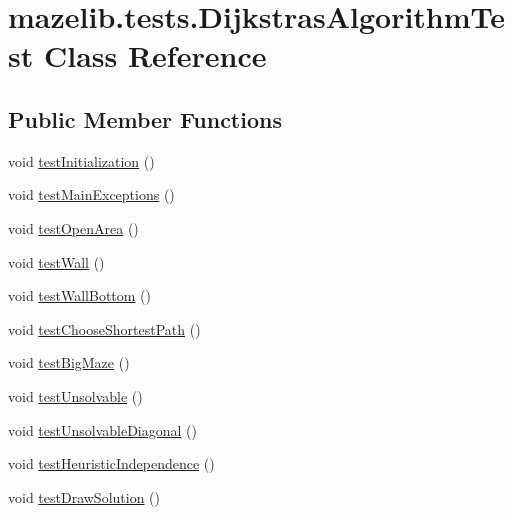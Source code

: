 \hypertarget{classmazelib_1_1tests_1_1_dijkstras_algorithm_test}{\section{mazelib.\-tests.\-Dijkstras\-Algorithm\-Test Class Reference}
\label{classmazelib_1_1tests_1_1_dijkstras_algorithm_test}
}
\subsection*{Public Member Functions}
\begin{DoxyCompactItemize}
\item 
void \hyperlink{classmazelib_1_1tests_1_1_dijkstras_algorithm_test_a1146e87fe1b5efcbbaa60fe88ab1ce08}{test\-Initialization} ()
\item 
void \hyperlink{classmazelib_1_1tests_1_1_dijkstras_algorithm_test_a2d20a1359ec9953b68e5c80d6b74e7fe}{test\-Main\-Exceptions} ()
\item 
void \hyperlink{classmazelib_1_1tests_1_1_dijkstras_algorithm_test_a89d3538fea9ac9435d3c10969c457c26}{test\-Open\-Area} ()
\item 
void \hyperlink{classmazelib_1_1tests_1_1_dijkstras_algorithm_test_a8a89aea0f3368802dfa118d8c7b38d72}{test\-Wall} ()
\item 
void \hyperlink{classmazelib_1_1tests_1_1_dijkstras_algorithm_test_abb427a3019f7e4886d718c9f026b57f7}{test\-Wall\-Bottom} ()
\item 
void \hyperlink{classmazelib_1_1tests_1_1_dijkstras_algorithm_test_afeec52b72833744e39ba281094dd96ec}{test\-Choose\-Shortest\-Path} ()
\item 
void \hyperlink{classmazelib_1_1tests_1_1_dijkstras_algorithm_test_a5bdb0931d622a52508b992fb9830efe8}{test\-Big\-Maze} ()
\item 
void \hyperlink{classmazelib_1_1tests_1_1_dijkstras_algorithm_test_a5a2da8268b9e90f3147d7a3275a69ad9}{test\-Unsolvable} ()
\item 
void \hyperlink{classmazelib_1_1tests_1_1_dijkstras_algorithm_test_a44771de70f3330345536faaf5e7d3d0d}{test\-Unsolvable\-Diagonal} ()
\item 
void \hyperlink{classmazelib_1_1tests_1_1_dijkstras_algorithm_test_af7b54eea5de705c27e280eefe3c83cd5}{test\-Heuristic\-Independence} ()
\item 
void \hyperlink{classmazelib_1_1tests_1_1_dijkstras_algorithm_test_a509f7c865dbe035833a3afd30585f9b2}{test\-Draw\-Solution} ()
\end{DoxyCompactItemize}


